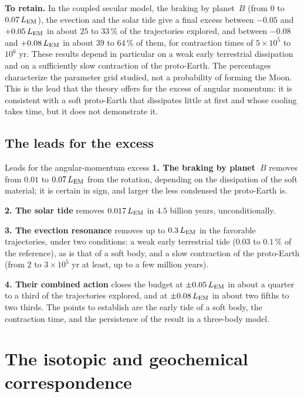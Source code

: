 \documentclass[11pt,a4paper]{article}
\newcommand{\LEM}{\ensuremath{L_{\rm EM}}}
\begin{document}
\textbf{To retain.} In the coupled secular model, the braking by planet~$B$ (from $0$ to $0.07\,\LEM$), the evection and the solar tide give a final excess between $-0.05$ and $+0.05\,\LEM$ in about $25$ to $33\,\%$ of the trajectories explored, and between $-0.08$ and $+0.08\,\LEM$ in about $39$ to $64\,\%$ of them, for contraction times of $5\times10^5$ to $10^6$ yr. These results depend in particular on a weak early terrestrial dissipation and on a sufficiently slow contraction of the proto-Earth. The percentages characterize the parameter grid studied, not a probability of forming the Moon. This is the lead that the theory offers for the excess of angular momentum: it is consistent with a soft proto-Earth that dissipates little at first and whose cooling takes time, but it does not demonstrate it.

\subsection{The leads for the excess}
\label{sec:pistes}

\begin{encadre}{Leads for the angular-momentum excess}
\small
\textbf{1. The braking by planet~$B$} removes from $0.01$ to $0.07\,\LEM$ from the rotation, depending on the dissipation of the soft material; it is certain in sign, and larger the less condensed the proto-Earth is.

\smallskip\noindent\textbf{2. The solar tide} removes $0.017\,\LEM$ in $4.5$ billion years, unconditionally.

\smallskip\noindent\textbf{3. The evection resonance} removes up to $0.3\,\LEM$ in the favorable trajectories, under two conditions: a weak early terrestrial tide ($0.03$ to $0.1\,\%$ of the reference), as is that of a soft body, and a slow contraction of the proto-Earth (from $2$ to $3\times10^5$ yr at least, up to a few million years).

\smallskip\noindent\textbf{4. Their combined action} closes the budget at $\pm0.05\,\LEM$ in about a quarter to a third of the trajectories explored, and at $\pm0.08\,\LEM$ in about two fifths to two thirds. The points to establish are the early tide of a soft body, the contraction time, and the persistence of the result in a three-body model.
\end{encadre}

\section{The isotopic and geochemical correspondence}
\label{sec:isotopes}
\end{document}
